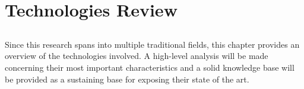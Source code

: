 \chapter{Technologies Review} %
\label{cha:technologies_review}

\section*{} %
Since this research spans into multiple traditional fields, this chapter provides an overview of the technologies involved. A high-level analysis will be made concerning their most important characteristics and a solid knowledge base will be provided as a sustaining base for exposing their state of the art.






